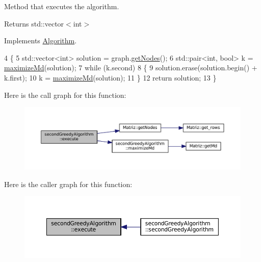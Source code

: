 Method that executes the algorithm. 

\begin{DoxyReturn}{Returns}
std\+::vector$<$int$>$ 
\end{DoxyReturn}


Implements \hyperlink{classAlgorithm_af6ea9eb9a6dbd41896e3fd7dabac096b}{Algorithm}.


\begin{DoxyCode}
4 \{
5   std::vector<int> solution = graph.\hyperlink{classMatriz_a394b84a5ec13fd2f4d202ab218680afe}{getNodes}();
6   std::pair<int, bool> k = \hyperlink{classsecondGreedyAlgorithm_a1935f11c28b41515f6953f8108fbf482}{maximizeMd}(solution);
7   \textcolor{keywordflow}{while} (k.second)
8   \{
9     solution.erase(solution.begin() + k.first);
10     k = \hyperlink{classsecondGreedyAlgorithm_a1935f11c28b41515f6953f8108fbf482}{maximizeMd}(solution);
11   \}
12   \textcolor{keywordflow}{return} solution;
13 \}
\end{DoxyCode}
Here is the call graph for this function\+:\nopagebreak
\begin{figure}[H]
\begin{center}
\leavevmode
\includegraphics[width=350pt]{classsecondGreedyAlgorithm_a119a730116003d00438179ccf4e2cafd_cgraph}
\end{center}
\end{figure}
Here is the caller graph for this function\+:\nopagebreak
\begin{figure}[H]
\begin{center}
\leavevmode
\includegraphics[width=350pt]{classsecondGreedyAlgorithm_a119a730116003d00438179ccf4e2cafd_icgraph}
\end{center}
\end{figure}
\mbox{\label{classsecondGreedyAlgorithm_a1935f11c28b41515f6953f8108fbf482}} 
